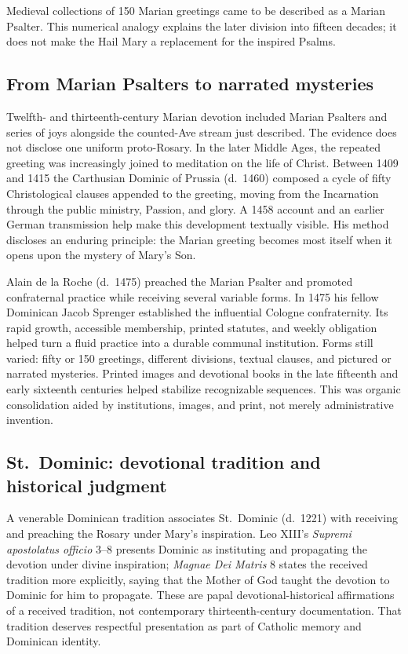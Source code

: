 Medieval collections of 150 Marian greetings came to be described as a Marian Psalter. This numerical analogy explains the later division into fifteen decades; it does not make the Hail Mary a replacement for the inspired Psalms.

\subsection{From Marian Psalters to narrated mysteries}

Twelfth- and thirteenth-century Marian devotion included Marian Psalters and series of joys alongside the counted-Ave stream just described. The evidence does not disclose one uniform proto-Rosary. In the later Middle Ages, the repeated greeting was increasingly joined to meditation on the life of Christ. Between 1409 and 1415 the Carthusian Dominic of Prussia (d.~1460) composed a cycle of fifty Christological clauses appended to the greeting, moving from the Incarnation through the public ministry, Passion, and glory. A 1458 account and an earlier German transmission help make this development textually visible. His method discloses an enduring principle: the Marian greeting becomes most itself when it opens upon the mystery of Mary's Son.

Alain de la Roche (d.~1475) preached the Marian Psalter and promoted confraternal practice while receiving several variable forms. In 1475 his fellow Dominican Jacob Sprenger established the influential Cologne confraternity. Its rapid growth, accessible membership, printed statutes, and weekly obligation helped turn a fluid practice into a durable communal institution. Forms still varied: fifty or 150 greetings, different divisions, textual clauses, and pictured or narrated mysteries. Printed images and devotional books in the late fifteenth and early sixteenth centuries helped stabilize recognizable sequences. This was organic consolidation aided by institutions, images, and print, not merely administrative invention.

\subsection{St.~Dominic: devotional tradition and historical judgment}

A venerable Dominican tradition associates St.~Dominic (d.~1221) with receiving and preaching the Rosary under Mary's inspiration. Leo XIII's \emph{Supremi apostolatus officio} 3--8 presents Dominic as instituting and propagating the devotion under divine inspiration; \emph{Magnae Dei Matris} 8 states the received tradition more explicitly, saying that the Mother of God taught the devotion to Dominic for him to propagate. These are papal devotional-historical affirmations of a received tradition, not contemporary thirteenth-century documentation. That tradition deserves respectful presentation as part of Catholic memory and Dominican identity.

